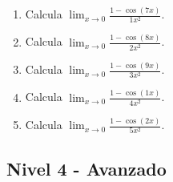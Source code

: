 \documentclass[11pt,a4paper]{article}
\begin{document}
\begin{enumerate}[label=\textbf{E\arabic*.},start=441]
\item Calcula $\displaystyle\lim_{x\to0}\frac{1-\cos(7x)}{1x^2}$.

\item Calcula $\displaystyle\lim_{x\to0}\frac{1-\cos(8x)}{2x^2}$.

\item Calcula $\displaystyle\lim_{x\to0}\frac{1-\cos(9x)}{3x^2}$.

\item Calcula $\displaystyle\lim_{x\to0}\frac{1-\cos(1x)}{4x^2}$.

\item Calcula $\displaystyle\lim_{x\to0}\frac{1-\cos(2x)}{5x^2}$.

\end{enumerate}

\subsection{Nivel 4 - Avanzado}
\end{document}
